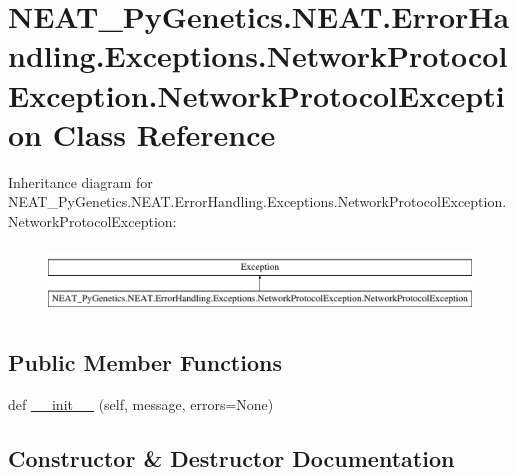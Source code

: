 \hypertarget{classNEAT__PyGenetics_1_1NEAT_1_1ErrorHandling_1_1Exceptions_1_1NetworkProtocolException_1_1NetworkProtocolException}{}\section{N\+E\+A\+T\+\_\+\+Py\+Genetics.\+N\+E\+A\+T.\+Error\+Handling.\+Exceptions.\+Network\+Protocol\+Exception.\+Network\+Protocol\+Exception Class Reference}
\label{classNEAT__PyGenetics_1_1NEAT_1_1ErrorHandling_1_1Exceptions_1_1NetworkProtocolException_1_1NetworkProtocolException}
Inheritance diagram for N\+E\+A\+T\+\_\+\+Py\+Genetics.\+N\+E\+A\+T.\+Error\+Handling.\+Exceptions.\+Network\+Protocol\+Exception.\+Network\+Protocol\+Exception\+:\begin{figure}[H]
\begin{center}
\leavevmode
\includegraphics[height=1.824104cm]{classNEAT__PyGenetics_1_1NEAT_1_1ErrorHandling_1_1Exceptions_1_1NetworkProtocolException_1_1NetworkProtocolException}
\end{center}
\end{figure}
\subsection*{Public Member Functions}
\begin{DoxyCompactItemize}
\item 
def \hyperlink{classNEAT__PyGenetics_1_1NEAT_1_1ErrorHandling_1_1Exceptions_1_1NetworkProtocolException_1_1NetworkProtocolException_a9d12de9b98da65c1a683fe038e066e49}{\+\_\+\+\_\+init\+\_\+\+\_\+} (self, message, errors=None)
\end{DoxyCompactItemize}


\subsection{Constructor \& Destructor Documentation}
